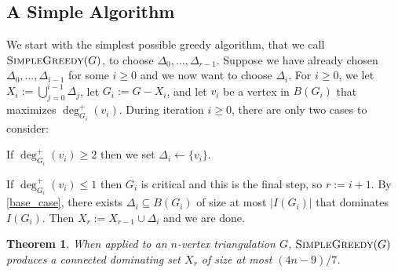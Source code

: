 \documentclass[11pt]{article}
\newtheorem{thm}{Theorem}
\theoremstyle{definition}
\begin{document}
\subsection{A Simple Algorithm}
\label{warm_up}

We start with the simplest possible greedy algorithm, that we call $\textsc{SimpleGreedy}(G)$, to choose $\Delta_0,\ldots,\Delta_{r-1}$.  Suppose we have already chosen $\Delta_0,\ldots,\Delta_{i-1}$ for some $i\ge 0$ and we now want to choose $\Delta_i$. For $i \geq 0$, we let $X_i:=\bigcup_{j=0}^{i-1}\Delta_j$, let $G_i:=G-X_i$, and let $v_i$ be a vertex in $B(G_i)$ that maximizes $\deg^+_{G_i}(v_i)$.  During iteration $i\ge 0$, there are only two cases to consider:
\begin{compactenum}[{[}g1{]}]
    \item If $\deg^+_{G_i}(v_i)\ge 2$ then we set $\Delta_i\gets\{v_i\}$.
    \item If $\deg^+_{G_i}(v_i)\le 1$ then $G_i$ is critical and this is the final step, so $r:=i+1$.  By \cref{base_case}, there exists $\Delta_i\subseteq B(G_i)$ of size at most $|I(G_i)|$ that dominates $I(G_i)$. Then $X_r:=X_{r-1}\cup\Delta_{i}$ and we are done.
\end{compactenum}

\begin{thm}\label{simple_greedy}
  When applied to an $n$-vertex triangulation $G$,  $\textsc{SimpleGreedy}(G)$ produces a connected dominating set $X_r$ of size at most $(4n-9)/7$.
\end{thm}
\end{document}
